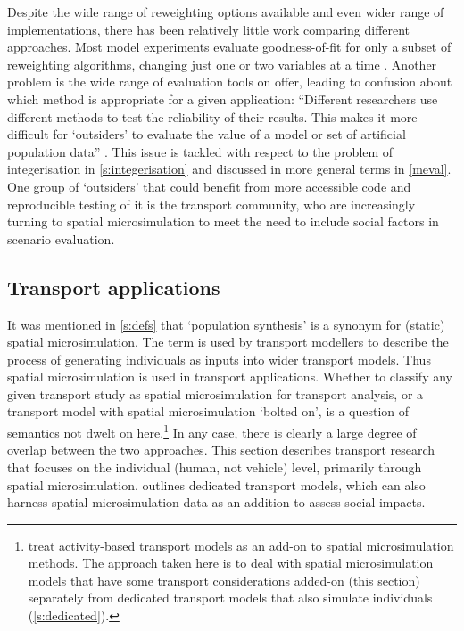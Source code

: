 \documentclass[a4paper, 11pt, twoside]{Thesis}
\begin{document}
Despite the wide range of reweighting options available and even wider
range of implementations, there has been relatively little work comparing
different approaches. Most model experiments evaluate goodness-of-fit for
only a subset of reweighting algorithms, changing just one or two variables
at a time \citep{Voas2000, Smith2009, Rahman2010}. Another problem is the
wide range of evaluation tools on offer, leading to confusion about
which method is appropriate for a given application:
``Different researchers use different methods to test the
reliability of their results. This makes it more difficult for `outsiders'
to evaluate the value of a model or set of artificial population data''
\citep[p.282]{Hermes2012a}. This issue is tackled with respect
to the problem of integerisation in \cref{s:integerisation}
and discussed in more general terms in \cref{meval}. One group
of `outsiders' that could benefit from more accessible code and
reproducible testing of it is the transport community, who are increasingly
turning to spatial microsimulation to meet the need to include
social factors in scenario evaluation.

\subsection{Transport applications}
It was mentioned in \cref{s:defs} that `population synthesis' is a synonym for
(static) spatial microsimulation. The term is used by transport modellers
to describe the
process of generating individuals as inputs into wider transport models.
Thus spatial microsimulation is used in transport applications.
Whether to classify any given transport study as spatial microsimulation for
transport analysis, or a transport model with spatial microsimulation
`bolted on', is a question of semantics not dwelt on
here.\footnote{\citet{Ballas2013-4policy-analysis}
treat activity-based
transport models as an add-on to spatial microsimulation methods.
The approach taken here is to deal with 
spatial microsimulation models that have some transport
considerations added-on (this section) separately from
dedicated transport models  that also simulate individuals
(\cref{s:dedicated}).}
In any case, there is clearly a
large degree of overlap between
the two approaches. This section describes transport research that focuses on the
individual (human, not vehicle) level, primarily through spatial microsimulation.
 outlines dedicated transport models, which can also harness
spatial microsimulation data as an addition to assess social impacts.
\end{document}
